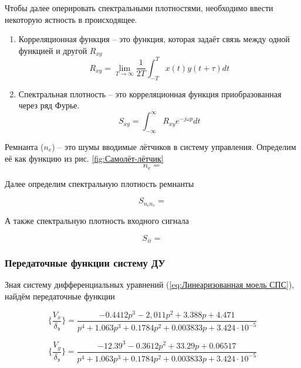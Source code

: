 Чтобы далее оперировать спектральными плотностями, необходимо ввести некоторую ястность в происходящее. 

\begin{enumerate}
    \item Корреляционная функция -- это функция, которая задаёт связь между одной функцией и другой $R_{xy}$
    $$R_{xy} = \lim_{T \to \infty} \frac{1}{2T} \int_{-T}^{T} x(t) y(t+\tau) dt$$
    \item Спектральная плотность -- это корреляционная функция приобразованная через ряд Фурье.
    $$S_{xy} = \int_{-\infty}^{\infty} R_{xy}e^{-j\omega p} dt$$
\end{enumerate}

Ремнанта ($n_e$) -- это шумы вводимые лётчиков в систему управления. Определим её как функцию из рис. {\ref{fig:Самолёт-лётчик}}
\begin{equation}
    \label{eq:Ремнанта}
    n_e = 
\end{equation}

Далее определим спектральную плотность ремнанты 

\begin{equation}
    \label{eq:Спектральная плотность ремнанты}
    S_{n_e n_e} = 
\end{equation}

А также спектральную плотность входного сигнала

\begin{equation}
    \label{eq:Спектральная плотность входного сигнала}
    S_{ii} = 
\end{equation}

\subsubsection{Передаточные функции систему ДУ}

Зная систему дифференциальных уравнений ({\ref{eq:Линеаризованная моель СПС}}), найдём передаточные функции 

\begin{equation}
    \label{eq:ПФ по горизонтальной скорости СПС}
    \{ \frac{V_x}{\delta_\text{э}} \} = \frac{-0.4412p^3 - 2,011p^2 + 3.388p + 4.471}{p^4 + 1.063p^3 + 0.1784p^2 + 0.003833p + 3.424 \cdot 10^{-5}}
\end{equation}

\begin{equation}
    \label{eq:ПФ по вертикальной скорости СПС}
    \{ \frac{V_y}{\delta_\text{э}} \} = \frac{-12.39^3 - 0.3612p^2 + 33.29p + 0.06517}{p^4 + 1.063p^3 + 0.1784p^2 + 0.003833p + 3.424 \cdot 10^{-5}}
\end{equation}

